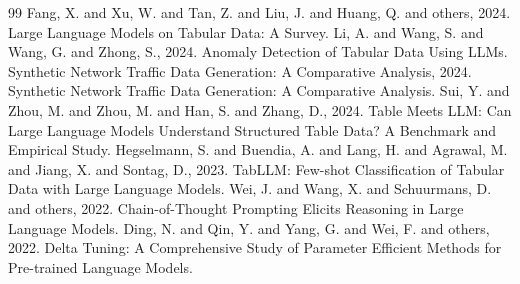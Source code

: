 \documentclass[12pt,a4paper]{article}
\begin{document}
\begin{thebibliography}{99}
 Fang, X. and Xu, W. and Tan, Z. and Liu, J. and Huang, Q. and others, 2024. Large Language Models on Tabular Data: A Survey.
 Li, A. and Wang, S. and Wang, G. and Zhong, S., 2024. Anomaly Detection of Tabular Data Using LLMs.
 Synthetic Network Traffic Data Generation: A Comparative Analysis, 2024. Synthetic Network Traffic Data Generation: A Comparative Analysis.
 Sui, Y. and Zhou, M. and Zhou, M. and Han, S. and Zhang, D., 2024. Table Meets LLM: Can Large Language Models Understand Structured Table Data? A Benchmark and Empirical Study.
 Hegselmann, S. and Buendia, A. and Lang, H. and Agrawal, M. and Jiang, X. and Sontag, D., 2023. TabLLM: Few-shot Classification of Tabular Data with Large Language Models.
 Wei, J. and Wang, X. and Schuurmans, D. and others, 2022. Chain-of-Thought Prompting Elicits Reasoning in Large Language Models.
 Ding, N. and Qin, Y. and Yang, G. and Wei, F. and others, 2022. Delta Tuning: A Comprehensive Study of Parameter Efficient Methods for Pre-trained Language Models.
\end{thebibliography}
\end{document}
